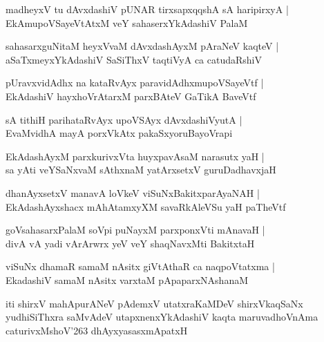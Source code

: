 \documentclass[twoside,12pt,openright]{book}
\def\S{\char'263}
\newcounter{shloka}[chapter]
\begin{document}
\begin{shloka}%
madheyxV tu dAvxdashiV pUNAR tirxsapxqqshA sA haripirxyA |\\
EkAmupoVSayeVtAtxM veY sahaserxYkAdashiV PalaM
\end{shloka}

\begin{shloka}%
sahasarxguNitaM heyxVvaM dAvxdashAyxM pAraNeV kaqteV |\\
aSaTxmeyxYkAdashiV SaSiThxV taqtiVyA ca catudaRshiV 
\end{shloka}

\begin{shloka}%
pUravxvidAdhx na kataRvAyx paravidAdhxmupoVSayeVtf |\\
EkAdashiV hayxhoVrAtarxM parxBAteV GaTikA BaveVtf
\end{shloka}

\begin{shloka}%
sA tithiH parihataRvAyx upoVSAyx dAvxdashiVyutA |\\
EvaMvidhA mayA porxVkAtx pakaSxyoruBayoVrapi
\end{shloka}

\begin{shloka}%
EkAdashAyxM parxkurivxVta huyxpavAsaM narasutx yaH |\\
sa yAti veYSaNxvaM sAthxnaM yatArxsetxV guruDadhavxjaH
\end{shloka}

\begin{shloka}%
dhanAyxsetxV manavA loVkeV viSuNxBakitxparAyaNAH |\\
EkAdashAyxshacx mAhAtamxyXM savaRkAleVSu yaH paTheVtf
\end{shloka}

\begin{shloka}%
goVsahasarxPalaM soVpi puNayxM parxponxVti mAnavaH |\\
divA vA yadi vArArwrx yeV veY shaqNavxMti BakitxtaH
\end{shloka}

\begin{shloka}%
viSuNx dhamaR samaM nAsitx giVtAthaR ca naqpoVtatxma |\\
EkadashiV samaM nAsitx varxtaM pApaparxNAshanaM
\end{shloka}

\begin{center}
iti shirxV mahApurANeV pAdemxV utatxraKaMDeV shirxVkaqSaNx yudhiSiThxra 
saMvAdeV utapxnenxYkAdashiV kaqta maruvadhoVnAma caturivxMshoV\S 
dhAyxyasasxmApatxH
\end{center}
\end{document}
